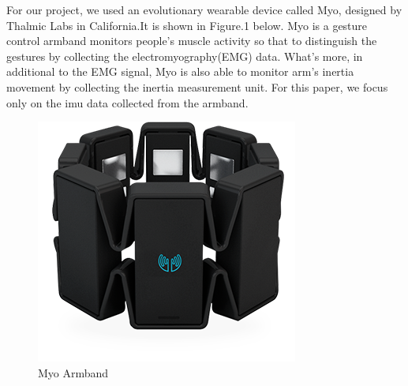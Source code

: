 \documentclass[a4paper, 10pt, conference]{IEEEtran}      %
\begin{document}
For our project, we used an evolutionary wearable device called Myo, designed by Thalmic Labs in California.It is shown in Figure.1 below. Myo is a gesture control armband monitors people's muscle activity so that to distinguish the gestures by collecting the electromyography(EMG) data. What's more, in additional to the EMG signal, Myo is also able to monitor arm's inertia movement by collecting the inertia measurement unit. For this paper, we focus only on the imu data collected from the armband.
\begin{figure}[thpb]
      \centering
      \includegraphics[scale=0.3]{myo_image_black.png} 
      \caption{Myo Armband}
      \label{img_label1}
\end{figure}

\end{document}
